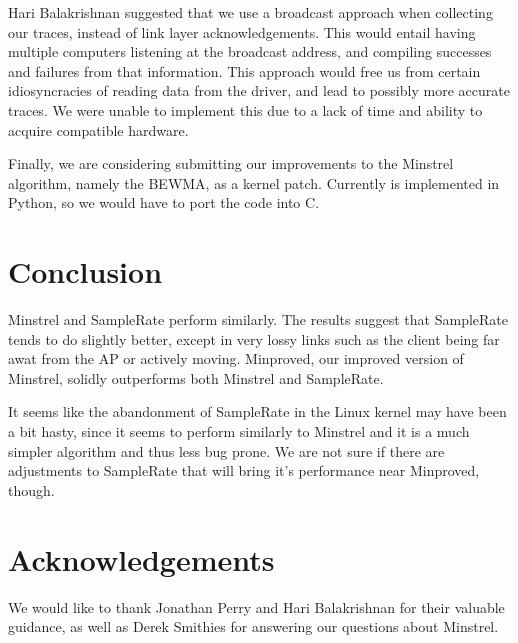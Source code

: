 \documentclass[letterpaper,twocolumn,10pt]{article}
\begin{document}
Hari Balakrishnan suggested that we use a broadcast approach when collecting our traces, instead of link layer acknowledgements. This would entail having multiple computers listening at the broadcast address, and compiling successes and failures from that information. This approach would free us from certain idiosyncracies of reading data from the driver, and lead to possibly more accurate traces. We were unable to implement this due to a lack of time and ability to acquire compatible hardware.

Finally, we are considering submitting our improvements to the Minstrel algorithm, namely the BEWMA, as a kernel patch. Currently is implemented in Python, so we would have to port the code into C.

\section{Conclusion}

Minstrel and SampleRate perform similarly. The results suggest that SampleRate tends to do slightly better, except in very lossy links such as the client being far awat from the AP or actively moving. Minproved, our improved version of Minstrel, solidly outperforms both Minstrel and SampleRate. 

It seems like the abandonment of SampleRate in the Linux kernel may have been a bit hasty, since it seems to perform similarly to Minstrel and it is a much simpler algorithm and thus less bug prone. We are not sure if there are adjustments to SampleRate that will bring it's performance near Minproved, though. 

\section{Acknowledgements}
We would like to thank Jonathan Perry and Hari Balakrishnan for their valuable guidance, as well as Derek Smithies for answering our questions about Minstrel. 


{\footnotesize 
}
\end{document}
